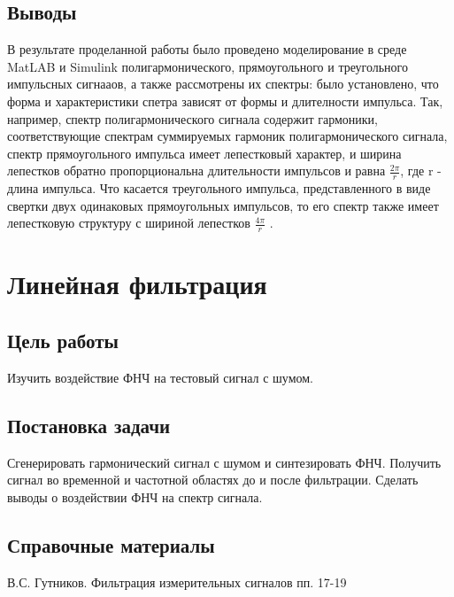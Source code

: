 \documentclass[10pt,a4paper]{article}
\begin{document}
\subsection{Выводы}
В результате проделанной работы было проведено моделирование в среде MatLAB и Simulink полигармонического, прямоугольного и треугольного импульсных сигнааов, а также рассмотрены их спектры: было установлено, что форма и характеристики спетра зависят от формы и длителности импульса. Так, например, спектр полигармонического сигнала содержит гармоники, соответствующие спектрам суммируемых гармоник полигармонического сигнала, спектр прямоугольного импульса имеет лепестковый характер, и ширина лепестков обратно пропорциональна длительности импульсов и равна $\frac{2\pi}{r}$, где r - длина импульса. Что касается треугольного импульса, представленного в виде свертки двух одинаковых прямоугольных импульсов, то его спектр также имеет лепестковую структуру с шириной лепестков $\frac{4\pi}{r}$ .

\newpage
\section{Линейная фильтрация}

\subsection{Цель работы}
Изучить воздействие ФНЧ на тестовый сигнал с шумом.

\subsection{Постановка задачи}
Сгенерировать гармонический сигнал с шумом и синтезировать ФНЧ. Получить сигнал во временной и частотной областях до и после фильтрации. Сделать выводы о воздействии ФНЧ на спектр сигнала.

\subsection{Справочные материалы}
В.С. Гутников. Фильтрация измерительных сигналов пп. 17-19
\end{document}

